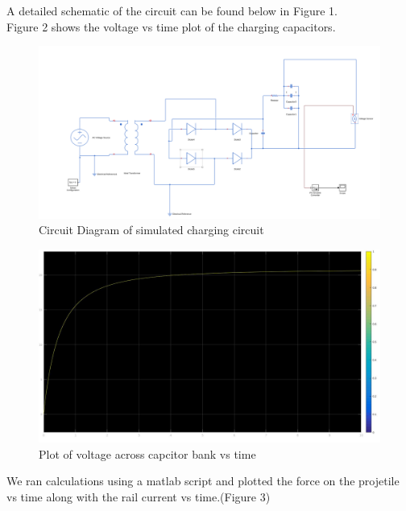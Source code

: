 \documentclass[twocolumn]{article}
\begin{document}
A detailed schematic of the circuit can be found below in Figure 1.
	\\
	
Figure 2 shows the voltage vs time plot of the charging capacitors.
	
\begin{figure}[htp]
	\caption{Circuit Diagram of simulated charging circuit}
	\includegraphics[width=\linewidth]{Circuit.png}
\end{figure}
	
	
\begin{figure}[h]
	\caption{Plot of voltage across capcitor bank vs time }
	\includegraphics[width=\linewidth]{charging.jpg}
\end{figure}
		
	
We ran calculations using a matlab script and plotted the force on the projetile vs time along with the rail current vs time.(Figure 3)
\end{document}
